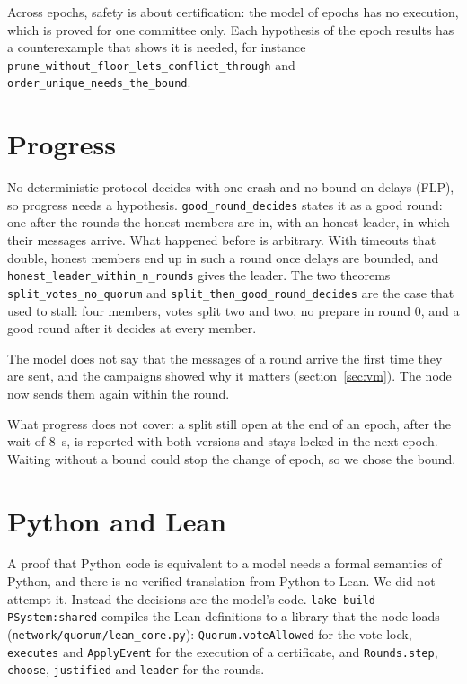 \documentclass[10pt,a4paper]{article}
\newcommand{\code}[1]{\texttt{#1}}
\begin{document}
Across epochs, safety is about certification: the model of epochs has no execution, which is proved
for one committee only. Each hypothesis of the epoch results has a counterexample that shows it is
needed, for instance \code{prune\_without\_floor\_lets\_conflict\_through} and
\code{order\_unique\_needs\_the\_bound}.

\section{Progress}

No deterministic protocol decides with one crash and no bound on delays (FLP), so progress needs a
hypothesis. \code{good\_round\_decides} states it as a good round: one after the rounds the honest members
are in, with an honest leader, in which their messages arrive. What happened before is arbitrary. With
timeouts that double, honest members end up in such a round once delays are bounded, and
\code{honest\_leader\_within\_n\_rounds} gives the leader. The two theorems \code{split\_votes\_no\_quorum}
and \code{split\_then\_good\_round\_decides} are the case that used to stall: four members, votes split two
and two, no prepare in round 0, and a good round after it decides at every member.

The model does not say that the messages of a round arrive the first time they are sent, and the
campaigns showed why it matters (section~\ref{sec:vm}). The node now sends them again within the round.

What progress does not cover: a split still open at the end of an epoch, after the wait of 8~s, is
reported with both versions and stays locked in the next epoch. Waiting without a bound could stop the
change of epoch, so we chose the bound.

\section{Python and Lean}\label{sec:link}

A proof that Python code is equivalent to a model needs a formal semantics of Python, and there is no
verified translation from Python to Lean. We did not attempt it. Instead the decisions are the model's
code. \code{lake build PSystem:shared} compiles the Lean definitions to a library that the node loads
(\code{network/quorum/lean\_core.py}): \code{Quorum.voteAllowed} for the vote lock, \code{executes} and
\code{ApplyEvent} for the execution of a certificate, and \code{Rounds.step}, \code{choose},
\code{justified} and \code{leader} for the rounds.
\end{document}
